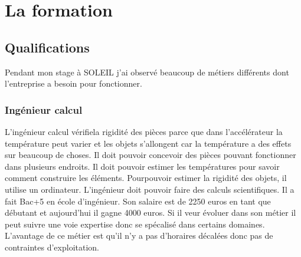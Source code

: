 
\chapter{La formation}

	
	\minitoc
	




			
	\section{Qualifications}

		Pendant mon stage à SOLEIL j'ai observé beaucoup de métiers différents dont l'entreprise a besoin pour fonctionner.

		\subsection{Ingénieur calcul}
			L'ingénieur calcul vérifiela rigidité des pièces parce que dans l'accélérateur la température peut varier et les objets s'allongent car la température a des effets sur beaucoup de choses. Il doit pouvoir concevoir des pièces pouvant fonctionner dans plusieurs endroits. Il doit pouvoir estimer les températures pour savoir comment construire les éléments. Pourpouvoir estimer la rigidité des objets, il utilise un ordinateur.
			L'ingénieur doit pouvoir faire des calculs scientifiques. Il a fait Bac+5 en école d'ingénieur. Son salaire est de 2250 euros en tant que débutant et aujourd'hui il gagne 4000 euros. Si il veur évoluer dans son métier il peut suivre une voie expertise donc se spécalisé dans certains domaines.
			L'avantage de ce métier est qu'il n'y a pas d'horaires décalées donc pas de contraintes d'exploitation.  
